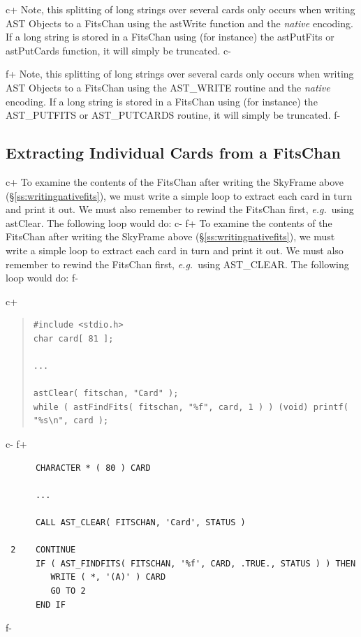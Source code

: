 \documentclass[twoside,11pt]{article}
\newcommand{\secref}[1]{\S\ref{#1}}
\newcommand{\secref}[1]{\ref{#1}}
\begin{document}
c+
Note, this splitting of long strings over several cards only occurs when
writing AST Objects to a FitsChan using the astWrite function and the
{\em native} encoding. If a long string is stored in a FitsChan using
(for instance) the astPutFits or astPutCards function, it will simply be truncated.
c-

f+
Note, this splitting of long strings over several cards only occurs when
writing AST Objects to a FitsChan using the AST\_WRITE routine and the
{\em native} encoding. If a long string is stored in a FitsChan using
(for instance) the AST\_PUTFITS or AST\_PUTCARDS routine, it will simply be truncated.
f-

\subsection{\label{ss:extractingfitscards}Extracting Individual Cards from a FitsChan}

c+
To examine the contents of the FitsChan after writing the SkyFrame
above (\secref{ss:writingnativefits}), we must write a simple loop to
extract each card in turn and print it out. We must also remember to
rewind the FitsChan first, {\em{e.g.}}\ using astClear. The following
loop would do:
c-
f+
To examine the contents of the FitsChan after writing the SkyFrame
above (\secref{ss:writingnativefits}), we must write a simple loop to
extract each card in turn and print it out. We must also remember to
rewind the FitsChan first, {\em{e.g.}}\ using AST\_CLEAR. The
following loop would do:
f-

c+
\begin{quote}
\small
\begin{verbatim}
#include <stdio.h>
char card[ 81 ];

...

astClear( fitschan, "Card" );
while ( astFindFits( fitschan, "%f", card, 1 ) ) (void) printf( "%s\n", card );
\end{verbatim}
\normalsize
\end{quote}
c-
f+
\small
\begin{verbatim}
      CHARACTER * ( 80 ) CARD

      ...

      CALL AST_CLEAR( FITSCHAN, 'Card', STATUS )

 2    CONTINUE
      IF ( AST_FINDFITS( FITSCHAN, '%f', CARD, .TRUE., STATUS ) ) THEN
         WRITE ( *, '(A)' ) CARD
         GO TO 2
      END IF
\end{verbatim}
\normalsize
f-
\end{document}
